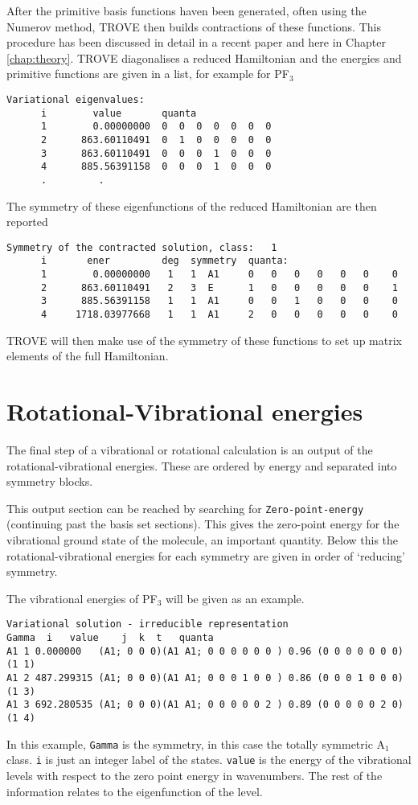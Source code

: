 After the primitive basis functions haven been generated, often using the Numerov method, TROVE then builds 
contractions of these functions. This procedure has been discussed in detail in a recent paper\cite{17YuYaOv.methods} 
and here in Chapter 
\ref{chap:theory}. TROVE diagonalises a reduced Hamiltonian and the energies and primitive functions are 
given in a list, for example for PF$_3$
\begin{verbatim}
Variational eigenvalues:
      i        value       quanta
      1        0.00000000  0  0  0  0  0  0  0
      2      863.60110491  0  1  0  0  0  0  0
      3      863.60110491  0  0  0  1  0  0  0
      4      885.56391158  0  0  0  1  0  0  0
      .         .          
\end{verbatim}
The symmetry of these eigenfunctions of the reduced Hamiltonian are then reported
\begin{verbatim}
Symmetry of the contracted solution, class:   1
      i       ener         deg  symmetry  quanta:
      1        0.00000000   1   1  A1     0   0   0   0   0   0    0
      2      863.60110491   2   3  E      1   0   0   0   0   0    1
      3      885.56391158   1   1  A1     0   0   1   0   0   0    0
      4     1718.03977668   1   1  A1     2   0   0   0   0   0    0

\end{verbatim}

TROVE will then make use of the symmetry of these functions to set up matrix elements of the full Hamiltonian.


\section{Rotational-Vibrational energies}
The final step of a vibrational or rotational calculation is an output of the rotational-vibrational energies. These are
ordered by energy and separated into symmetry blocks.

This output section can be reached by searching for \verb|Zero-point-energy| (continuing past the basis set sections). This
gives the zero-point energy for the vibrational ground state of the molecule, an important quantity. 
Below this the rotational-vibrational energies for each symmetry are given in order of `reducing' symmetry. 

The vibrational energies of PF$_3$ will be given as an example.
\begin{verbatim}
Variational solution - irreducible representation
Gamma  i   value    j  k  t   quanta
A1 1 0.000000   (A1; 0 0 0)(A1 A1; 0 0 0 0 0 0 ) 0.96 (0 0 0 0 0 0 0) (1 1)
A1 2 487.299315 (A1; 0 0 0)(A1 A1; 0 0 0 1 0 0 ) 0.86 (0 0 0 1 0 0 0) (1 3)
A1 3 692.280535 (A1; 0 0 0)(A1 A1; 0 0 0 0 0 2 ) 0.89 (0 0 0 0 0 2 0) (1 4)
\end{verbatim}
In this example, \verb|Gamma| is the symmetry, in this case the totally symmetric A$_1$ class. \verb|i| is just an integer
label of the states. \verb|value| is the energy of the vibrational levels with respect to the zero point energy in wavenumbers.
The rest of the information relates to the eigenfunction of the level. 

